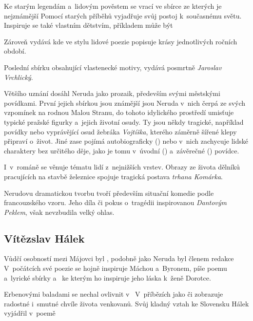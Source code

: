 Ke starým legendám a~lidovým pověstem se vrací ve sbírce  ze kterých je nejznámější  Pomocí
starých příběhů vyjadřuje svůj postoj k~současnému světu. Inspiruje se
také vlastním dětstvím, příkladem může být 

Zároveň vydává  kde ve stylu lidové poezie popisuje
krásy jednotlivých ročních období.

Poslední sbírku  obsahující vlastenecké motivy,
vydává posmrtně \emph{Jaroslav Vrchlický}.

Většího uznání dosáhl Neruda jako prozaik, především svými městskými
povídkami. První jejich sbírkou jsou  známější jsou
 Neruda v~nich čerpá ze svých vzpomínek 
na rodnou Malou Stranu, do tohoto idylického prostředí umisťuje typické
pražské figurky a~jejich životní osudy. Ty jsou někdy tragické,
například povídky  nebo  vyprávějící osud žebráka \emph{Vojtíška}, kterého záměrně
šířené klepy připraví o~život. Jiné zase pojímá autobiograficky
() nebo v~nich zachycuje lidské charaktery bez
určitého děje, jako je tomu v~úvodní ()
a~závěrečné () povídce.

I~v~románě  se věnuje tématu lidí z~nejnižších vrstev.
Obrazy ze života dělníků pracujících na stavbě železnice spojuje
tragická postava \emph{trhana Komárka}.

Nerudovu dramatickou tvorbu tvoří především situační komedie podle
francouzského vzoru. Jeho díla   či pokus o~tragédii  inspirovanou
\emph{Dantovým Peklem}, však nevzbudila velký ohlas.

\subsection*{Vítězslav Hálek}
Vůdčí osobností mezi Májovci byl , podobně jako
Neruda byl členem redakce  V~počátcích své poezie
se hojně inspiruje Máchou a~Byronem, píše poemu  a~lyrické
sbírky  a~ ke kterým ho inspiruje
jeho láska k~ženě Dorotce.

Erbenovými baladami se nechal ovlivnit v~ V~příbězích jako  či  zobrazuje
radostné i~smutné chvíle života venkovanů. Svůj kladný vztah ke
Slovensku Hálek vyjádřil v~poemě 

